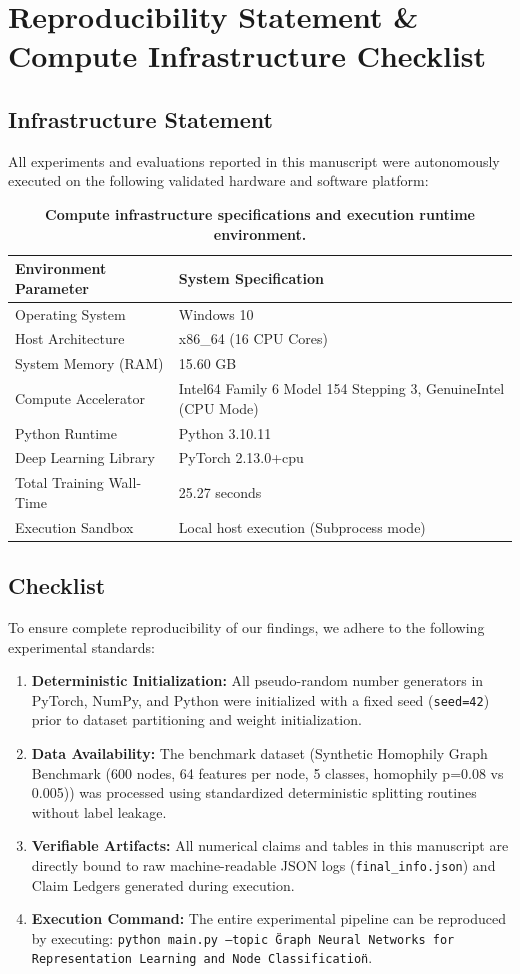 \documentclass[10pt,twocolumn]{article}
\begin{document}
\section{Reproducibility Statement \& Compute Infrastructure Checklist}
\subsection{Infrastructure Statement}
All experiments and evaluations reported in this manuscript were autonomously executed on the following validated hardware and software platform:

\begin{table}[t]
\centering
\caption{\textbf{Compute infrastructure specifications and execution runtime environment.}}
\begin{tabular}{ll}
\toprule
\textbf{Environment Parameter} & \textbf{System Specification} \\
\midrule
Operating System & Windows 10 \\
Host Architecture & x86\_64 (16 CPU Cores) \\
System Memory (RAM) & 15.60 GB \\
Compute Accelerator & Intel64 Family 6 Model 154 Stepping 3, GenuineIntel (CPU Mode) \\
Python Runtime & Python 3.10.11 \\
Deep Learning Library & PyTorch 2.13.0+cpu \\
Total Training Wall-Time & 25.27 seconds \\
Execution Sandbox & Local host execution (Subprocess mode) \\
\bottomrule
\end{tabular}
\label{tab:compute_environment}
\end{table}

\subsection{Checklist}
To ensure complete reproducibility of our findings, we adhere to the following experimental standards:
\begin{enumerate}
  \item \textbf{Deterministic Initialization:} All pseudo-random number generators in PyTorch, NumPy, and Python were initialized with a fixed seed (\texttt{seed=42}) prior to dataset partitioning and weight initialization.
  \item \textbf{Data Availability:} The benchmark dataset (Synthetic Homophily Graph Benchmark (600 nodes, 64 features per node, 5 classes, homophily p=0.08 vs 0.005)) was processed using standardized deterministic splitting routines without label leakage.
  \item \textbf{Verifiable Artifacts:} All numerical claims and tables in this manuscript are directly bound to raw machine-readable JSON logs (\texttt{final\_info.json}) and Claim Ledgers generated during execution.
  \item \textbf{Execution Command:} The entire experimental pipeline can be reproduced by executing:
  \texttt{python main.py --topic \"Graph Neural Networks for Representation Learning and Node Classification\"}.
\end{enumerate}
\end{document}
